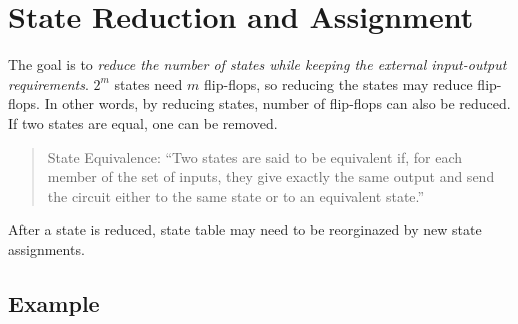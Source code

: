 \section{State Reduction and Assignment}
\label{sec:state-reduction-and-assignment}

The goal is to \textit{reduce the number of states while keeping the external input-output requirements}. $2^m$ states need $m$ flip-flops, so reducing the states may reduce flip-flops. In other words, by reducing states, number of flip-flops can also be reduced. If two states are equal, one can be removed.
\begin{quote}
  State Equivalence: ``Two states are said to be equivalent if, for each member of the set of inputs, they give exactly the same output and send the circuit either to the same state or to an equivalent state.''
\end{quote}
\noindent After a state is reduced, state table may need to be reorginazed by new state assignments.

\subsection*{Example}

